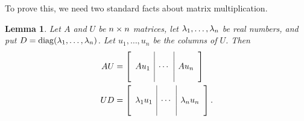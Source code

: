 \documentclass[reqno]{amsart}
\newtheorem{lemma}[theorem]{Lemma}
\theoremstyle{definition}
\begin{document}
To prove this, we need two standard facts about matrix multiplication.
\begin{lemma}\label{lem-diagonal-basis}
 Let $A$ and $U$ be $n\times n$ matrices, let $\lambda_1,\dotsc,\lambda_n$ be
 real numbers, and put $D=\operatorname{diag}(\lambda_1,\dotsc,\lambda_n)$.  Let
 $u_1,\dotsc,u_n$ be the columns of $U$.  Then 
 \begin{align*}
  AU &= \left[\begin{array}{c|c|c}
         && \\ Au_1 & \cdots & Au_n \\ &&
        \end{array}\right] \\
  UD &= \left[\begin{array}{c|c|c}
         && \\ \lambda_1u_1 & \cdots & \lambda_nu_n \\ &&
        \end{array}\right].
 \end{align*}
\end{lemma}
\end{document}
